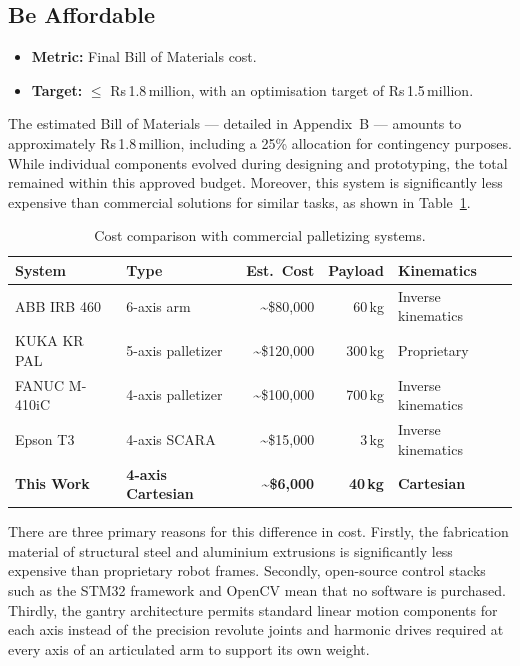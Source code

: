 \subsection{Be Affordable}

\begin{itemize}
    \item \textbf{Metric:} Final Bill of Materials cost.
    \item \textbf{Target:} $\leq$ Rs\,1.8\,million, with an optimisation target of Rs\,1.5\,million.
\end{itemize}

The estimated Bill of Materials --- detailed in Appendix~B --- amounts to approximately Rs\,1.8\,million, including a 25\% allocation for contingency purposes. While individual components evolved during designing and prototyping, the total remained within this approved budget. Moreover, this system is significantly less expensive than commercial solutions for similar tasks, as shown in Table~\ref{tab:cost_comparison}.

\begin{table}[h]
\centering
\caption{Cost comparison with commercial palletizing systems.}
\label{tab:cost_comparison}
\begin{tabular}{llrrl}
\toprule
\textbf{System} & \textbf{Type} & \textbf{Est.\ Cost} & \textbf{Payload} & \textbf{Kinematics} \\
\midrule
ABB IRB 460      & 6-axis arm        & \textasciitilde\$80,000   & 60\,kg  & Inverse kinematics \\
KUKA KR PAL      & 5-axis palletizer & \textasciitilde\$120,000  & 300\,kg & Proprietary        \\
FANUC M-410iC    & 4-axis palletizer & \textasciitilde\$100,000  & 700\,kg & Inverse kinematics \\
Epson T3         & 4-axis SCARA      & \textasciitilde\$15,000   & 3\,kg   & Inverse kinematics \\
\textbf{This Work} & \textbf{4-axis Cartesian} & \textbf{\textasciitilde\$6,000} & \textbf{40\,kg} & \textbf{Cartesian} \\
\bottomrule
\end{tabular}
\end{table}

There are three primary reasons for this difference in cost. Firstly, the fabrication material of structural steel and aluminium extrusions is significantly less expensive than proprietary robot frames. Secondly, open-source control stacks such as the STM32 framework and OpenCV mean that no software is purchased. Thirdly, the gantry architecture permits standard linear motion components for each axis instead of the precision revolute joints and harmonic drives required at every axis of an articulated arm to support its own weight.

